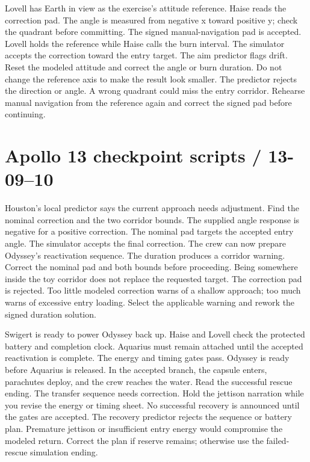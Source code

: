 {Lovell has Earth in view as the exercise's attitude reference.
Haise reads the correction pad.
The angle is measured from negative x toward positive y;
check the quadrant before committing.}
{The signed manual-navigation pad is accepted.
Lovell holds the reference while Haise calls the burn interval.
The simulator accepts the correction toward the entry target.}
{The aim predictor flags drift.
Reset the modeled attitude and correct the angle or burn duration.
Do not change the reference axis to make the result look smaller.}
{The predictor rejects the direction or angle.
A wrong quadrant could miss the entry corridor.
Rehearse manual navigation from the reference again and correct
the signed pad before continuing.}

\clearpage
\section*{Apollo 13 checkpoint scripts / 13-09--10}
{Houston's local predictor says the current approach needs adjustment.
Find the nominal correction and the two corridor bounds.
The supplied angle response is negative for a positive correction.}
{The nominal pad targets the accepted entry angle.
The simulator accepts the final correction.
The crew can now prepare Odyssey's reactivation sequence.}
{The duration produces a corridor warning.
Correct the nominal pad and both bounds before proceeding.
Being somewhere inside the toy corridor does not replace the requested target.}
{The correction pad is rejected.
Too little modeled correction warns of a shallow approach;
too much warns of excessive entry loading.
Select the applicable warning and rework the signed duration solution.}

{Swigert is ready to power Odyssey back up.
Haise and Lovell check the protected battery and completion clock.
Aquarius must remain attached until the accepted reactivation is complete.}
{The energy and timing gates pass.
Odyssey is ready before Aquarius is released.
In the accepted branch, the capsule enters, parachutes deploy,
and the crew reaches the water. Read the successful rescue ending.}
{The transfer sequence needs correction.
Hold the jettison narration while you revise the energy or timing sheet.
No successful recovery is announced until the gates are accepted.}
{The recovery predictor rejects the sequence or battery plan.
Premature jettison or insufficient entry energy would compromise
the modeled return. Correct the plan if reserve remains;
otherwise use the failed-rescue simulation ending.}

